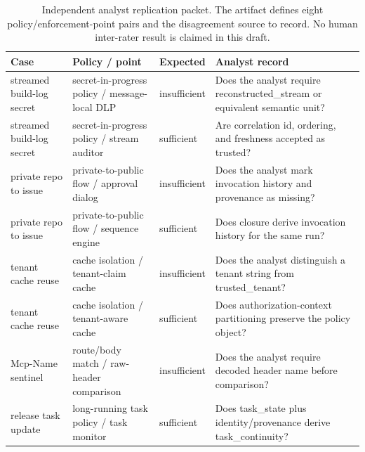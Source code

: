 \begin{table}[t]
  \caption{Independent analyst replication packet. The artifact defines eight
  policy/enforcement-point pairs and the disagreement source to record. No
  human inter-rater result is claimed in this draft.}
  \label{tab:replication-packet}
  \centering\footnotesize
  \begin{tabular}{@{}p{}p{}p{}p{}@{}}
    \toprule
    Case & Policy / point & Expected & Analyst record \\
    \midrule
    streamed build-log secret & secret-in-progress policy / message-local DLP & insufficient & Does the analyst require reconstructed\_stream or equivalent semantic unit? \\
    streamed build-log secret & secret-in-progress policy / stream auditor & sufficient & Are correlation id, ordering, and freshness accepted as trusted? \\
    private repo to issue & private-to-public flow / approval dialog & insufficient & Does the analyst mark invocation history and provenance as missing? \\
    private repo to issue & private-to-public flow / sequence engine & sufficient & Does closure derive invocation history for the same run? \\
    tenant cache reuse & cache isolation / tenant-claim cache & insufficient & Does the analyst distinguish a tenant string from trusted\_tenant? \\
    tenant cache reuse & cache isolation / tenant-aware cache & sufficient & Does authorization-context partitioning preserve the policy object? \\
    Mcp-Name sentinel & route/body match / raw-header comparison & insufficient & Does the analyst require decoded header name before comparison? \\
    release task update & long-running task policy / task monitor & sufficient & Does task\_state plus identity/provenance derive task\_continuity? \\
    \bottomrule
  \end{tabular}
\end{table}
